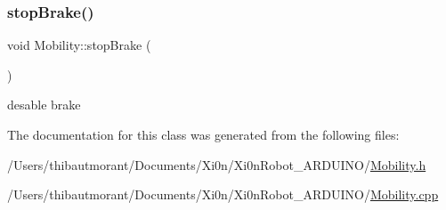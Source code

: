\subsubsection{\texorpdfstring{stop\+Brake()}{stopBrake()}}
{\footnotesize\ttfamily void Mobility\+::stop\+Brake (\begin{DoxyParamCaption}{ }\end{DoxyParamCaption})}



desable brake 



The documentation for this class was generated from the following files\+:\begin{DoxyCompactItemize}
\item 
/\+Users/thibautmorant/\+Documents/\+Xi0n/\+Xi0n\+Robot\+\_\+\+A\+R\+D\+U\+I\+N\+O/\hyperlink{_mobility_8h}{Mobility.\+h}\item 
/\+Users/thibautmorant/\+Documents/\+Xi0n/\+Xi0n\+Robot\+\_\+\+A\+R\+D\+U\+I\+N\+O/\hyperlink{_mobility_8cpp}{Mobility.\+cpp}\end{DoxyCompactItemize}
